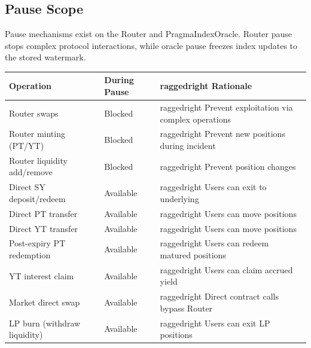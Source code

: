 \subsection{Pause Scope}

Pause mechanisms exist on the Router and PragmaIndexOracle. Router pause stops complex protocol interactions, while oracle pause freezes index updates to the stored watermark.

\begin{center}
\begin{tabularx}{\textwidth}{l l >{raggedright\arraybackslash}X}
\toprule
\textbf{Operation} & \textbf{During Pause} & \textbf{Rationale} \\
\midrule
Router swaps & Blocked & Prevent exploitation via complex operations \\
Router minting (PT/YT) & Blocked & Prevent new positions during incident \\
Router liquidity add/remove & Blocked & Prevent position changes \\
\midrule
Direct SY deposit/redeem & Available & Users can exit to underlying \\
Direct PT transfer & Available & Users can move positions \\
Direct YT transfer & Available & Users can move positions \\
Post-expiry PT redemption & Available & Users can redeem matured positions \\
YT interest claim & Available & Users can claim accrued yield \\
Market direct swap & Available & Direct contract calls bypass Router \\
LP burn (withdraw liquidity) & Available & Users can exit LP positions \\
\bottomrule
\end{tabularx}
\end{center}

\begin{center}
\end{center}

